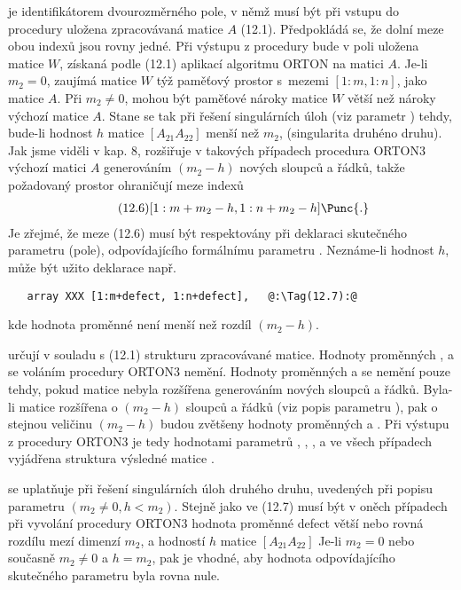  je identifikátorem dvourozměrného pole, v němž
musí být při vstupu do procedury uložena zpracovávaná matice
$A$ (12.1). Předpokládá se, že dolní meze obou indexů jsou
rovny jedné. Při výstupu z procedury bude v poli  uložena matice
$W$, získaná podle (12.1) aplikací algoritmu ORTON na matici $A$.
Je-li $m_2 = 0$, zaujímá matice $W$ týž paměťový prostor s~mezemi
$[1:m,1:n]$, jako matice $A$. Při $m_2 \ne 0$, mohou být paměťové nároky
matice $W$ větší než nároky výchozí matice $A$. Stane se tak při
řešení singulárních úloh (viz parametr ) tehdy, bude-li
hodnost $h$ matice $[A_{21} A_{22} ]$ menší než $m_2$, (singularita
druhéno druhu). Jak jsme viděli v kap. 8, rozšiřuje v takových
případech procedura ORTON3 výchozí matici $A$ generováním $(m_2 - h)$
nových sloupců a řádků, takže požadovaný prostor ohraničují
meze indexů
%
\begin{align*}
  \tag{12.6}  [ 1:m+m_2 - h, 1:n + m_2 - h]\Punc{.}
\end{align*}
%
Je zřejmé, že meze (12.6) musí být respektovány při deklaraci
skutečného parametru (pole), odpovídajícího formálnímu parametru
. Neznáme-li hodnost $h$, může být užito 
de\-kla\-ra\-ce např.
%
\begin{lstlisting}
   array XXX [1:m+defect, 1:n+defect],   @:\Tag(12.7):@
\end{lstlisting}
%
kde hodnota proměnné  není menší než rozdíl $(m_2-h)$.


určují v souladu s (12.1) strukturu zpracovávané matice. Hodnoty
 proměnných ,  a  se voláním procedury ORTON3
nemění. Hodnoty proměnných  a  se nemění pouze tehdy,
pokud matice  nebyla rozšířena generováním nových sloupců a
řádků. Byla-li matice  rozšířena o $(m_2-h)$ sloupců a řádků (viz
popis parametru ), pak o stejnou veličinu $(m_2-h)$ budou
zvětšeny hodnoty proměnných  a . Při výstupu z procedury
ORTON3 je tedy hodnotami parametrů , , , 
a  ve všech případech vyjádřena struktura výsledné matice .

 se uplatňuje při řešení singulárních úloh
druhého druhu, uvedených při popisu parametru  $(m_2 \ne 0, h<m_2)$.
Stejně jako ve (12.7) musí být v oněch případech při vyvolání
procedury ORTON3 hodnota proměnné defect větší nebo rovná
rozdílu mezí dimenzí $m_2$, a hodností $h$ matice $[A_{21} A_{22}]$ Je-li
$m_2=0$ nebo současně $m_2 \ne 0$ a $h=m_2$, pak je vhodné, aby hodnota
odpovídajícího skutečného parametru byla rovna nule.

